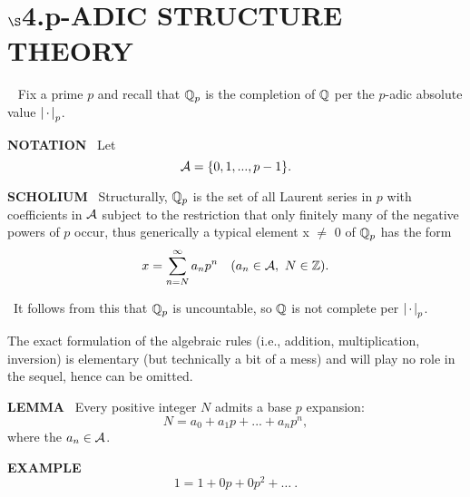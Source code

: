 \chapter{
$\boldsymbol{\S}$\textbf{4}.\quad  p-ADIC STRUCTURE THEORY}
\setlength\parindent{2em}
\setcounter{theoremn}{0}

\ \indent 
Fix a prime $p$ and recall that 
$\mathbb{Q}_p$
is the completion of $\mathbb{Q}$ per the $p$-adic absolute value 
$\left\vert\hspace{0.05cm} \cdot \hspace{0.05cm}\right\vert_{p}$.\\

\begin{x}{\small\bf NOTATION} \  
Let
\[
\mathcal{A}= \{0,1, ..., p-1\}.
\]
\index{$\sA$}
\end{x}
\vspace{0.1cm}
			
\begin{x}{\small\bf SCHOLIUM}  \ 
Structurally, $\mathbb{Q}_{p}$ is the set of all Laurent series in $p$ with coefficients in $\sA$ subject to the restriction that only finitely many of the negative powers of $p$ occur, thus generically a typical element x $\neq$ 0 of $\mathbb{Q}_{p} $ has the form 
\[
x =  \sum_{n=N}^\infty a_{n} p^n   \quad (a_{n}  \in \mathcal{A} , \ N \in  \mathbb{Z}).
\]
\end{x}
\vspace{0.1cm}

\begin{x}{\small\bf \un{N.B.}}  \  
It follows from this that $\mathbb{Q}_{p}$ is uncountable, so $\mathbb{Q}$ is not complete per $\left\vert\hspace{0.05cm} \cdot \hspace{0.05cm}\right\vert_{p}$.\\
\end{x}
\vspace{0.1cm}

\indent The exact formulation of the algebraic rules (i.e., addition, multiplication, inversion) is elementary (but technically a bit of a mess) and will play no role in the sequel, hence can be omitted.\\


\begin{x}{\small\bf LEMMA} \ 
Every positive integer $N$ admits a base $p$ expansion:
\[
N =  a_{0} + a_{1} p + ... + a_{n} p^n, 	 
\]
where the $a_{n}  \in \mathcal{A}$.
\end{x}
\vspace{0.1cm}


\begin{x}{\small\bf EXAMPLE} \ 
\[
1= 1 +  0p  + 0p^2 + \dots \ .
\]
\end{x}
\vspace{0.1cm}


